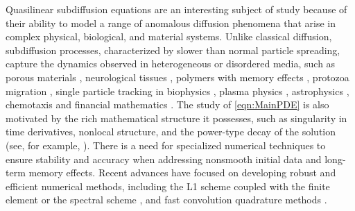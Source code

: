 \documentclass[12pt,a4paper]{article}
\begin{document}
Quasilinear subdiffusion equations are an interesting subject of study because of their ability to model a range of anomalous diffusion phenomena that arise in complex physical, biological, and material systems. Unlike classical diffusion, subdiffusion processes, characterized by slower than normal particle spreading, capture the dynamics observed in heterogeneous or disordered media, such as porous materials \cite{plociniczak2014approximation, plociniczak2015analytical, plociniczak2019derivation, pachepsky2000simulating, El20}, neurological tissues \cite{magin2010fractional}, polymers with memory effects \cite{metzler2000random, muller2011nonlinear}, protozoa migration \cite{alves2016transient}, single particle tracking in biophysics \cite{tabei2013intracellular, Sun17, wong2004anomalous}, plasma physics \cite{Del05}, astrophysics \cite{lawrence1993anomalous}, chemotaxis \cite{langlands2010fractional} and financial mathematics \cite{jacquier2020anomalous}. The study of \eqref{eqn:MainPDE} is also motivated by the rich mathematical structure it possesses, such as singularity in time derivatives, nonlocal structure, and the power-type decay of the solution (see, for example, \cite{allen2016parabolic, wittbold2021bounded, vergara2015optimal, akagi2019fractional, dipierro2019decay}). There is a need for specialized numerical techniques to ensure stability and accuracy when addressing nonsmooth initial data and long-term memory effects. Recent advances have focused on developing robust and efficient numerical methods, including the L1 scheme coupled with the finite element \cite{Jin19a, Mus18, plociniczak2022error,plociniczak2024fully, plociniczak2023linear} or the spectral scheme \cite{Lin07}, and fast convolution quadrature methods \cite{lopez2025convolution, cuesta2006convolution}.
\end{document}

